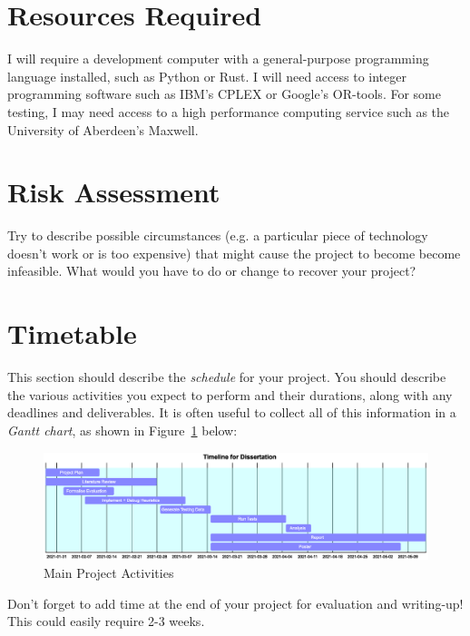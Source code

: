 \documentclass[a4paper,12pt]{article}
\begin{document}
\section*{Resources Required}

I will require a development computer with a general-purpose programming
language installed, such as Python or Rust. I will need access to integer
programming software such as IBM's CPLEX or Google's OR-tools. For some
testing, I may need access to a high performance computing service such
as the University of Aberdeen's Maxwell.

\section*{Risk Assessment}

Try to describe possible circumstances (e.g. a particular piece of
technology doesn't work or is too expensive) that might cause
the project to become become infeasible. What would you have to do
or change to recover your project?

\section*{Timetable}

This section should describe the {\em schedule} for your project. 
You should describe the various activities you expect to perform
and their durations, along with any deadlines and deliverables.
It is often useful to collect all of this information in a
{\em Gantt chart}, as shown in Figure~\ref{fig:plan} below:

\begin{figure}[htb]
\begin{center}
\includegraphics[scale=0.4]{gantt.eps}
\caption{Main Project Activities\label{fig:plan}}
\end{center}
\end{figure}


Don't forget to add time at the end of your project for 
evaluation and writing-up! This could easily require 2-3 weeks.



\end{document}
